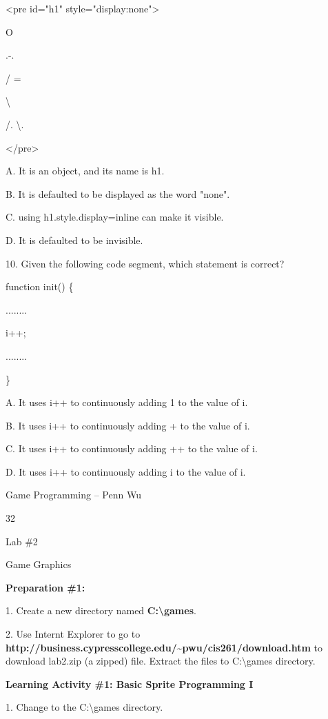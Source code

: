 \documentclass[
]{article}
\begin{document}
\textless pre id="h1" style="display:none"\textgreater{}

O

.\textbar-.\textquotesingle{}

/ =

\textbar{} \textbackslash{}

/. \textbackslash.

\textless/pre\textgreater{}

A. It is an object, and its name is h1.

B. It is defaulted to be displayed as the word "none".

C. using h1.style.display=\textquotesingle inline\textquotesingle{} can
make it visible.

D. It is defaulted to be invisible.

10. Given the following code segment, which statement is correct?

function init() \{

........

i++;

........

\}

A. It uses i++ to continuously adding 1 to the value of i.

B. It uses i++ to continuously adding + to the value of i.

C. It uses i++ to continuously adding ++ to the value of i.

D. It uses i++ to continuously adding i to the value of i.

Game Programming -- Penn Wu

32

\protect\hypertarget{index_split_003.htmlux5cux23p33}{}{}

Lab \#2

Game Graphics

\textbf{}

\textbf{Preparation \#1:}

1. Create a new directory named \textbf{C:\textbackslash games}.

2. Use Internt Explorer to go to
\textbf{http://business.cypresscollege.edu/\textasciitilde pwu/cis261/download.htm}
to download lab2.zip (a zipped) file. Extract the files to
C:\textbackslash games directory.

\textbf{}

\textbf{Learning Activity \#1: Basic Sprite Programming I}

1. Change to the C:\textbackslash games directory.
\end{document}
